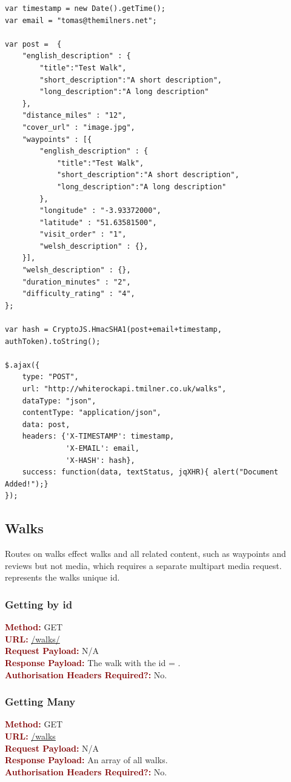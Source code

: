 \documentclass[11pt,a4paper]{report}
\begin{document}
\begin{lstlisting}[captionpos=b, caption=Adding a walk., label=lst:addingDoc]
var timestamp = new Date().getTime();
var email = "tomas@themilners.net";

var post =  {
	"english_description" : {
	  	"title":"Test Walk",
		"short_description":"A short description",
		"long_description":"A long description"
	},
	"distance_miles" : "12",
	"cover_url" : "image.jpg",
	"waypoints" : [{
		"english_description" : {
			"title":"Test Walk",
			"short_description":"A short description",
			"long_description":"A long description"
		},
		"longitude" : "-3.93372000",
		"latitude" : "51.63581500",
		"visit_order" : "1",
		"welsh_description" : {},
	}],
	"welsh_description" : {},
	"duration_minutes" : "2",
	"difficulty_rating" : "4",
};

var hash = CryptoJS.HmacSHA1(post+email+timestamp, authToken).toString();

$.ajax({
    type: "POST",
    url: "http://whiterockapi.tmilner.co.uk/walks",
    dataType: "json",
    contentType: "application/json",
    data: post,
    headers: {'X-TIMESTAMP': timestamp,
        	  'X-EMAIL': email,
        	  'X-HASH': hash},
    success: function(data, textStatus, jqXHR){ alert("Document Added!");}
});
\end{lstlisting}

\subsection{Walks}

Routes on walks effect walks and all related content, such as waypoints and reviews but not media, which requires a separate multipart media request.  represents the walks unique id.

\subsubsection{Getting by id}
\textbf{\textcolor{Maroon}{Method:}} GET\\
\textbf{\textcolor{Maroon}{URL:}} \url{/walks/}\\
\textbf{\textcolor{Maroon}{Request Payload:}} N/A\\
\textbf{\textcolor{Maroon}{Response Payload:}} The walk with the id = .\\
\textbf{\textcolor{Maroon}{Authorisation Headers Required?:}} No.

\subsubsection{Getting Many}
\textbf{\textcolor{Maroon}{Method:}} GET\\
\textbf{\textcolor{Maroon}{URL:}} \url{/walks}\\
\textbf{\textcolor{Maroon}{Request Payload:}} N/A\\
\textbf{\textcolor{Maroon}{Response Payload:}} An array of all walks.\\
\textbf{\textcolor{Maroon}{Authorisation Headers Required?:}} No.
\end{document}
